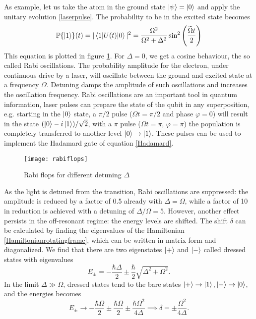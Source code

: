 As example, let us take the atom in the ground state $\ket{\psi} = \ket{0}$ and apply the unitary evolution \eqref{laserpulse}. The probability to be in the excited state becomes
\begin{equation}
\mathbb{P}\{\ket{1}\}(t) = |\braket{1|U(t)|0}|^2 = \frac{\Omega^2}{\Omega^2+\Delta^2} \sin^2\left(\frac{\widetilde{\Omega}t}{2} \right)
\end{equation}
This equation is plotted in figure \ref{rabiflops}. For $\Delta = 0$, we get a cosine behaviour, the so called Rabi oscillations. The probability amplitude for the electron, under continuous drive by a laser, will oscillate between the ground and excited state at a frequency $\Omega$. Detuning damps the amplitude of such oscillations and increases the oscillation frequency. Rabi oscillations are an important tool in quantum information, laser pulses can prepare the state of the qubit in any superposition, e.g. starting in the $\ket{0}$ state, a $\pi/2$ pulse ($\Omega t = \pi/2$ and phase $\varphi=0$) will result in the state $(\ket{0} - i\ket{1})/\sqrt{2}$, with a $\pi$ pulse ($\Omega t = \pi$, $\varphi=\pi$) the population is completely transferred to another level $\ket{0}\to \ket{1}$. These pulses can be used to implement the Hadamard gate of equation \eqref{Hadamard}.
\begin{figure}[H]
\centering
\texttt{[image: rabiflops]}
\caption{Rabi flops for different detuning $\Delta$}
\label{rabiflops}
\end{figure}
As the light is detuned from the transition, Rabi oscillations are suppressed: the amplitude is reduced by a factor of 0.5 already with $\Delta = \Omega$, while a factor of 10 in reduction is achieved with a detuning of $\Delta/\Omega = 5$. However, another effect persists in the off-resonant regime: the energy levels are shifted.
The shift $\delta$ can be calculated by finding the eigenvalues of the Hamiltonian \eqref{Hamiltonianrotatingframe}, which can be written in matrix form and diagonalized. We find that there are two eigenstates $\ket{+}$ and $\ket{-}$ called dressed states with eigenvalues
\begin{equation}
E_{\pm} = -\frac{\hbar\Delta}{2} \pm \frac{\hbar}{2}\sqrt{\Delta^2 +\Omega^2}.
\end{equation}
In the limit $\Delta \gg \Omega$, dressed states tend to the bare states $\ket{+} \to \ket{1},\ket{-}\to \ket{0}$, and the energies becomes
\begin{equation}
\label{eq:starkshift}
E_{\pm} \to -\frac{\hbar \Omega}{2} \pm \frac{\hbar \Omega}{2} \pm \frac{\hbar \Omega^2}{4\Delta} \implies \delta = \pm\frac{\Omega^2}{4\Delta}.
\end{equation}
